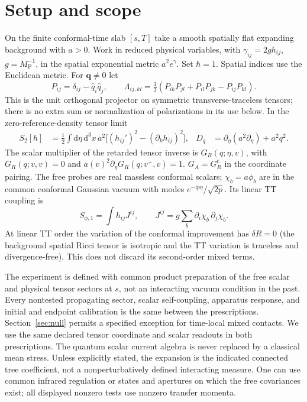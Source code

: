 \documentclass[11pt]{article}
\newcommand{\dd}{\mathrm{d}}
\newcommand{\ii}{\mathrm{i}}
\newcommand{\bq}{\boldsymbol q}
\begin{document}
\section{Setup and scope}
On the finite conformal-time slab \([s,T]\) take a smooth spatially flat expanding background with \(a>0\). Work in reduced physical variables, with \(\gamma_{ij}=2g h_{ij}\), \(g=M_{\mathrm P}^{-1}\), in the spatial exponential metric \(a^2 e^\gamma\). Set \(\hbar=1\). Spatial indices use the Euclidean metric. For \(\bq\ne0\) let
\[
 P_{ij}=\delta_{ij}-\hat q_i\hat q_j,\qquad
 \Lambda_{ij,kl}=\tfrac12(P_{ik}P_{jl}+P_{il}P_{jk}-P_{ij}P_{kl}).
\]
This is the unit orthogonal projector on symmetric transverse-traceless tensors; there is no extra sum or normalization of polarizations in its use below. In the zero-reference-density tensor limit
\begin{align}
 S_2[h]&=\tfrac12\int \dd\eta\,\dd^3x\,a^2\big[(h_{ij}')^2-(\partial_k h_{ij})^2\big],
 &
 D_q&=\partial_\eta (a^2\partial_\eta)+a^2q^2 .
 \label{eq:S2}
\end{align}
The scalar multiplier of the retarded tensor inverse is \(G_R(q;\eta,v)\), with \(G_R(q;v,v)=0\) and \(a(v)^2\partial_\eta G_R(q;v^+,v)=1\). \(G_A=G_R^t\) in the coordinate pairing. The free probes are real massless conformal scalars; \(\chi_b=a\phi_b\) are in the common conformal Gaussian vacuum with modes \(e^{-\ii p\eta}/\sqrt{2p}\). Its linear TT coupling is
\begin{equation}
 S_{\phi,1}=\int h_{ij}J^{ij},\qquad
 J^{ij}=g\sum_b \partial_i\chi_b\,\partial_j\chi_b .
 \label{eq:scalar}
\end{equation}
At linear TT order the variation of the conformal improvement has \(\delta R=0\) (the background spatial Ricci tensor is isotropic and the TT variation is traceless and divergence-free). This does not discard its second-order mixed terms.

The experiment is defined with common product preparation of the free scalar and physical tensor sectors at \(s\), not an interacting vacuum condition in the past. Every nontested propagating sector, scalar self-coupling, apparatus response, and initial and endpoint calibration is the same between the prescriptions. Section~\ref{sec:null} permits a specified exception for time-local mixed contacts. We use the same declared tensor coordinate and scalar readouts in both prescriptions. The quantum scalar current algebra is never replaced by a classical mean stress. Unless explicitly stated, the expansion is the indicated connected tree coefficient, not a nonperturbatively defined interacting measure. One can use common infrared regulation or states and apertures on which the free covariances exist; all displayed nonzero tests use nonzero transfer momenta.
\end{document}
